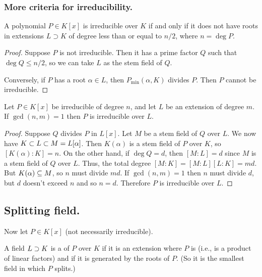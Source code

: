 \subsubsection{More criteria for irreducibility.}
\begin{cor}
A polynomial $P \in K[x]$ is irreducible over $K$ if and only if it does not have roots in extensions $L \supset K$ of degree less than or equal to $n / 2$, where $n = \deg P$.
\end{cor}
\begin{proof}
Suppose $P$ is not irreducible. Then it has a prime factor $Q$ such that $\deg Q \leq n/2$, so we can take $L$ as the stem field of $Q$.

Conversely, if $P$ has a root $\alpha \in L$, then $P_{\min}(\alpha, K)$ divides $P$. Then $P$ cannot be irreducible.
\end{proof}

\begin{cor}
Let $P \in K[x]$ be irreducible of degree $n$, and let $L$ be an extension of degree $m$. If $\gcd(n, m) = 1$ then $P$ is irreducible over $L$.
\end{cor}
\begin{proof}
Suppose $Q$ divides $P$ in $L[x]$. Let $M$ be a stem field of $Q$ over $L$. We now have $K \subset L \subset M = L[\alpha]$. Then $K(\alpha)$ is a stem field of $P$ over $K$, so $[K(\alpha):K] = n$. On the other hand, if $\deg Q = d$, then $[M:L] = d$ since $M$ is a stem field of $Q$ over $L$. Thus, the total degree $[M:K] = [M:L][L:K] = m d$. But $K(\alpha) \subseteq M$, so $n$ must divide $md$. If $\gcd(n,m) = 1$ then $n$ must divide $d$, but $d$ doesn't exceed $n$ and so $n = d$. Therefore $P$ is irreducible over $L$.
\end{proof}

\subsection{Splitting field.}
Now let $P \in K[x]$ (not necessarily irreducible).

\begin{defn}
A field $L \supset K$ is a  of $P$ over $K$ if it is an extension where $P$ is  (i.e., is a product of linear factors) and if it is generated by the roots of $P$. (So it is the smallest field in which $P$ splits.)
\end{defn}

